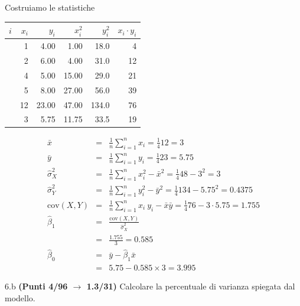 \documentclass[
  11pt,
]{book}
\theoremstyle{mytheoremstyle}
\theoremstyle{mydefstyle}
\newenvironment{sol}
  {
  \begin{tcolorbox}[enhanced,breakable,arc=0.1mm,boxrule=1pt,colback=white,colframe=iblue,
  title=\bf \fontfamily{lmss}\selectfont \hspace{.5 cm} Soluzione,drop fuzzy shadow]

}{
\end{tcolorbox}
  }
\begin{document}
\begin{sol}

Costruiamo le statistiche

\begin{table}[H]
\centering
\begin{tabular}{>{\raggedright\arraybackslash}p{3em}rrrrr}
\toprule
$i$ & $x_i$ & $y_i$ & $x_i^2$ & $y_i^2$ & $x_i\cdot y_i$\\
\midrule
\cellcolor[HTML]{E6E6E6}{1} & 1 & 4.00 & 1.00 & 18.0 & 4\\
\cellcolor[HTML]{E6E6E6}{2} & 2 & 6.00 & 4.00 & 31.0 & 12\\
\cellcolor[HTML]{E6E6E6}{3} & 4 & 5.00 & 15.00 & 29.0 & 21\\
\cellcolor[HTML]{E6E6E6}{4} & 5 & 8.00 & 27.00 & 56.0 & 39\\
\cellcolor[HTML]{E6E6E6}{Totale} & 12 & 23.00 & 47.00 & 134.0 & 76\\
\cellcolor[HTML]{E6E6E6}{Totale/n} & 3 & 5.75 & 11.75 & 33.5 & 19\\
\bottomrule
\end{tabular}
\end{table}

\begin{eqnarray*}
           \bar x &=&\frac 1 n\sum_{i=1}^n x_i = \frac {1}{ 4 }  12 =  3 \\
           \bar y &=&\frac 1 n\sum_{i=1}^n y_i = \frac {1}{ 4 }  23 =  5.75 \\
           \hat\sigma_X^2&=&\frac 1 n\sum_{i=1}^n x_i^2-\bar x^2=\frac {1}{ 4 }  48  - 3 ^2= 3 \\
           \hat\sigma_Y^2&=&\frac 1 n\sum_{i=1}^n y_i^2-\bar y^2=\frac {1}{ 4 }  134  - 5.75 ^2= 0.4375 \\
           \text{cov}(X,Y)&=&\frac 1 n\sum_{i=1}^n x_i~y_i-\bar x\bar y=\frac {1}{ 4 }  76 - 3 \cdot 5.75 = 1.755 \\
           \hat\beta_1 &=& \frac{\text{cov}(X,Y)}{\hat\sigma_X^2} \\
                    &=& \frac{ 1.755 }{ 3 }  =  0.585 \\
           \hat\beta_0 &=& \bar y - \hat\beta_1 \bar x\\
                    &=&  5.75 - 0.585 \times  3 = 3.995 
         \end{eqnarray*}

\end{sol}

6.b \textbf{(Punti 4/96 \(\rightarrow\) 1.3/31)} Calcolare la percentuale di varianza spiegata dal modello.
\end{document}
